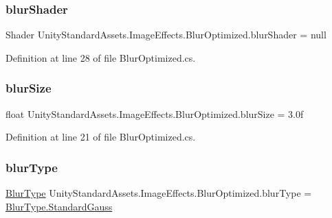 \subsubsection{\texorpdfstring{blur\+Shader}{blurShader}}
{\footnotesize\ttfamily Shader Unity\+Standard\+Assets.\+Image\+Effects.\+Blur\+Optimized.\+blur\+Shader = null}



Definition at line 28 of file Blur\+Optimized.\+cs.

\mbox{\label{class_unity_standard_assets_1_1_image_effects_1_1_blur_optimized_a76eb4bf88962770b9791b64df3c60408}} 
\subsubsection{\texorpdfstring{blur\+Size}{blurSize}}
{\footnotesize\ttfamily float Unity\+Standard\+Assets.\+Image\+Effects.\+Blur\+Optimized.\+blur\+Size = 3.\+0f}



Definition at line 21 of file Blur\+Optimized.\+cs.

\mbox{\label{class_unity_standard_assets_1_1_image_effects_1_1_blur_optimized_a65821cd7517fbb96a9333b9a14df967d}} 
\subsubsection{\texorpdfstring{blur\+Type}{blurType}}
{\footnotesize\ttfamily \mbox{\hyperlink{class_unity_standard_assets_1_1_image_effects_1_1_blur_optimized_a5e014aebbf344dbbec6748cd537b0790}{Blur\+Type}} Unity\+Standard\+Assets.\+Image\+Effects.\+Blur\+Optimized.\+blur\+Type = \mbox{\hyperlink{class_unity_standard_assets_1_1_image_effects_1_1_blur_optimized_a5e014aebbf344dbbec6748cd537b0790acf52c93fe9c4abb6723ffded2ad3d603}{Blur\+Type.\+Standard\+Gauss}}}



